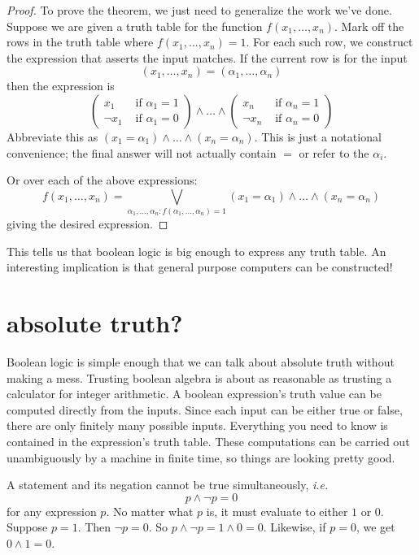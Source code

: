 \documentclass{scrbook}
\newcommand{\ie}{\emph{i.e.}\xspace}
\begin{document}
\begin{proof}
To prove the theorem, we just need to generalize the work we've done. Suppose we are given a truth table for the function $f(x_1,\dots, x_n)$. Mark off the rows in the truth table where $f(x_1,\dots,x_n)=1$. For each such row, we construct the expression that asserts the input matches. If the current row is for the input
\[
(x_1,\dots, x_n)=(\alpha_1,\dots, \alpha_n)
\]
then the expression is
\[
\left (
  \begin{matrix}
    x_1 & \textrm{ if } \alpha_1=1 \\
    \neg x_1 & \textrm { if } \alpha_1=0
  \end{matrix}
\right)
\wedge
\dots
\wedge
\left (
  \begin{matrix}
    x_n & \textrm{ if } \alpha_n=1 \\
    \neg x_n & \textrm { if } \alpha_n=0
  \end{matrix}
\right)
\]
Abbreviate this as $(x_1=\alpha_1)\wedge \dots \wedge (x_n=\alpha_n)$. This is just a notational convenience; the final answer will not actually contain $=$ or refer to the $\alpha_i$. 

Or over each of the above expressions: 
\[
f(x_1,\dots,x_n)= \bigvee_{\alpha_1,\dots,\alpha_n: f(\alpha_1,\dots,\alpha_n)=1} (x_1=\alpha_1)\wedge \dots \wedge (x_n=\alpha_n)
\]
giving the desired expression. 
\end{proof}
This tells us that boolean logic is big enough to express any truth table. An interesting implication is that general purpose computers can be constructed!
\section[Absolute Truth?]{absolute truth?}
Boolean logic is simple enough that we can talk about absolute truth without making a mess. Trusting boolean algebra is about as reasonable as trusting a calculator for integer arithmetic. 
A boolean expression's truth value can be computed directly from the inputs. Since each input can be either true or false, there are only finitely many possible inputs. Everything you need to know is contained in the expression's truth table. These computations can be carried out unambiguously by a machine in finite time, so things are looking pretty good.

A statement and its negation cannot be true simultaneously, \ie
\[
p \wedge \neg p = 0
\]
for any expression $p$. No matter what $p$ is, it must evaluate to either $1$ or $0$. Suppose $p=1$. Then $\neg p=0$. So $p\wedge \neg p = 1 \wedge 0 =0$. Likewise, if $p=0$, we get $0\wedge 1=0$. 
\end{document}
